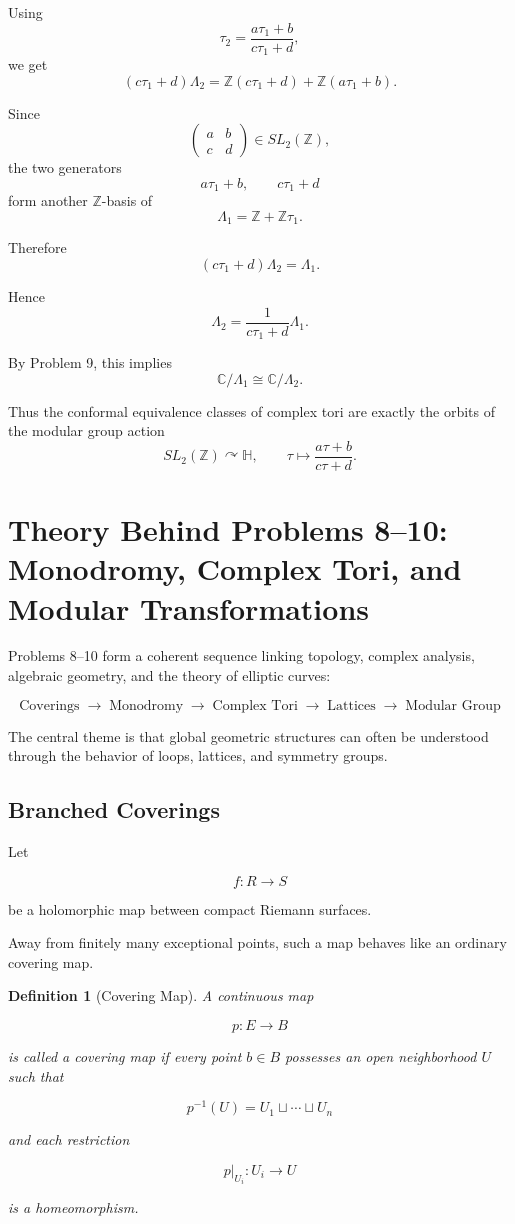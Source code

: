 \documentclass[12pt,a4paper]{article}
\theoremstyle{notespace}
\newtheorem{definition}{Definition}[subsection]
\begin{document}
Using
\[
\tau_2=\frac{a\tau_1+b}{c\tau_1+d},
\]
we get
\[
(c\tau_1+d)\Lambda_2
=
\mathbb Z(c\tau_1+d)+\mathbb Z(a\tau_1+b).
\]

Since
\[
\begin{pmatrix}
	a & b\\
	c & d
\end{pmatrix}
\in SL_2(\mathbb Z),
\]
the two generators
\[
a\tau_1+b,
\qquad
c\tau_1+d
\]
form another \(\mathbb Z\)-basis of
\[
\Lambda_1=\mathbb Z+\mathbb Z\tau_1.
\]

Therefore
\[
(c\tau_1+d)\Lambda_2=\Lambda_1.
\]

Hence
\[
\Lambda_2=\frac{1}{c\tau_1+d}\Lambda_1.
\]

By Problem 9, this implies
\[
\mathbb C/\Lambda_1
\cong
\mathbb C/\Lambda_2.
\]

Thus the conformal equivalence classes of complex tori are exactly the
orbits of the modular group action
\[
SL_2(\mathbb Z)\curvearrowright\mathbb H,
\qquad
\tau\mapsto \frac{a\tau+b}{c\tau+d}.
\]

\section{Theory Behind Problems 8--10: Monodromy, Complex Tori, and Modular Transformations}

Problems 8--10 form a coherent sequence linking topology, complex
analysis, algebraic geometry, and the theory of elliptic curves:

\[
\boxed{
	\text{Coverings}
	\;\longrightarrow\;
	\text{Monodromy}
	\;\longrightarrow\;
	\text{Complex Tori}
	\;\longrightarrow\;
	\text{Lattices}
	\;\longrightarrow\;
	\text{Modular Group}
}
\]

The central theme is that global geometric structures can often be
understood through the behavior of loops, lattices, and symmetry groups.

\subsection{Branched Coverings}

Let

\[
f:R\to S
\]

be a holomorphic map between compact Riemann surfaces.

Away from finitely many exceptional points, such a map behaves like an
ordinary covering map.

\begin{definition}[Covering Map]
	A continuous map
	
	\[
	p:E\to B
	\]
	
	is called a covering map if every point \(b\in B\) possesses an open
	neighborhood \(U\) such that
	
	\[
	p^{-1}(U)
	=
	U_1\sqcup\cdots\sqcup U_n
	\]
	
	and each restriction
	
	\[
	p|_{U_i}:U_i\to U
	\]
	
	is a homeomorphism.
\end{definition}
\end{document}
